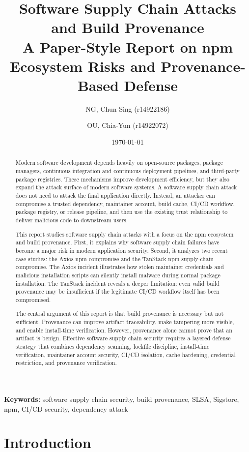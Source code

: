 \documentclass[12pt,a4paper]{article}
\title{\bfseries Software Supply Chain Attacks and Build Provenance\\
\large A Paper-Style Report on npm Ecosystem Risks and Provenance-Based Defense}
\author{NG, Chun Sing (r14922186) \and OU, Chia-Yun (r14922072)}
\date{\today}
\begin{document}
\maketitle

\begin{abstract}
Modern software development depends heavily on open-source packages, package managers, continuous integration and continuous deployment pipelines, and third-party package registries. These mechanisms improve development efficiency, but they also expand the attack surface of modern software systems. A software supply chain attack does not need to attack the final application directly. Instead, an attacker can compromise a trusted dependency, maintainer account, build cache, CI/CD workflow, package registry, or release pipeline, and then use the existing trust relationship to deliver malicious code to downstream users.

This report studies software supply chain attacks with a focus on the npm ecosystem and build provenance. First, it explains why software supply chain failures have become a major risk in modern application security. Second, it analyzes two recent case studies: the Axios npm compromise and the TanStack npm supply-chain compromise. The Axios incident illustrates how stolen maintainer credentials and malicious installation scripts can silently install malware during normal package installation. The TanStack incident reveals a deeper limitation: even valid build provenance may be insufficient if the legitimate CI/CD workflow itself has been compromised.

The central argument of this report is that build provenance is necessary but not sufficient. Provenance can improve artifact traceability, make tampering more visible, and enable install-time verification. However, provenance alone cannot prove that an artifact is benign. Effective software supply chain security requires a layered defense strategy that combines dependency scanning, lockfile discipline, install-time verification, maintainer account security, CI/CD isolation, cache hardening, credential restriction, and provenance verification.
\end{abstract}

\noindent\textbf{Keywords:} software supply chain security, build provenance, SLSA, Sigstore, npm, CI/CD security, dependency attack

\newpage
\tableofcontents
\newpage

\section{Introduction}
\end{document}

